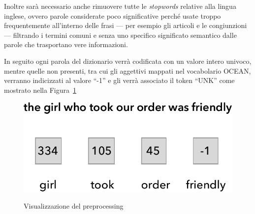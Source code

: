 Inoltre sarà necessario anche rimuovere tutte le \emph{stopwords} relative alla lingua inglese, ovvero parole considerate poco significative perché usate troppo frequentemente all'interno delle frasi --- per esempio gli articoli e le congiunzioni --- filtrando i termini comuni e senza uno specifico significato semantico dalle parole che trasportano vere informazioni.

In seguito ogni parola del dizionario verrà codificata con un valore intero univoco, mentre quelle non presenti, tra cui gli aggettivi mappati nel vocabolario OCEAN, verranno indicizzati al valore ``-1'' e gli verrà associato il token ``UNK'' come mostrato nella Figura~\ref{fig:preprocessing}
\begin{figure}[H]
	\centering
	{\includegraphics[width=.5\textwidth]{images/preprocessing}}
	\caption{Visualizzazione del preprocessing}
	\label{fig:preprocessing}
\end{figure}


